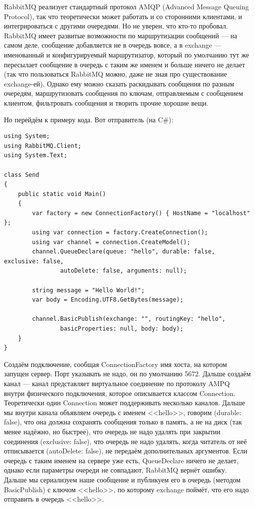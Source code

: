 \documentclass{../../text-style}
\begin{document}
RabbitMQ реализует стандартный протокол AMQP (Advanced Message Queuing Protocol), так что теоретически может работать и со сторонними клиентами, и интегрироваться с другими очередями. Но не уверен, что кто-то пробовал. RabbitMQ имеет развитые возможности по маршрутизации сообщений --- на самом деле, сообщение добавляется не в очередь вовсе, а в exchange --- именованный и конфигурируемый маршрутизатор, который по умолчанию тут же пересылает сообщение в очередь с таким же именем и больше ничего не делает (так что пользоваться RabbitMQ можно, даже не зная про существование exchange-ей). Однако ему можно сказать раскидывать сообщения по разным очередям, маршрутизовать сообщения по ключам, отправляемым с сообщением клиентом, фильтровать сообщения и творить прочие хорошие вещи.

Но перейдём к примеру кода. Вот отправитель (на C\#):

\begin{verbatim}
using System;
using RabbitMQ.Client;
using System.Text;

class Send
{
    public static void Main()
    {
        var factory = new ConnectionFactory() { HostName = "localhost" };
        using var connection = factory.CreateConnection();
        using var channel = connection.CreateModel();
        channel.QueueDeclare(queue: "hello", durable: false, exclusive: false,
                autoDelete: false, arguments: null);

        string message = "Hello World!";
        var body = Encoding.UTF8.GetBytes(message);

        channel.BasicPublish(exchange: "", routingKey: "hello",
                basicProperties: null, body: body);
    }
}
\end{verbatim}

Создаём подключение, сообщая ConnectionFactory имя хоста, на котором запущен сервер. Порт указывать не надо, он по умолчанию 5672. Дальше создаём канал --- канал представляет виртуальное соединение по протоколу AMPQ внутри физического подключения, которое описывается классом Connection. Теоретически один Connection может поддерживать несколько каналов. Дальше мы внутри канала объявляем очередь с именем <<hello>>, говорим (durable: false), что она должна сохранять сообщения только в память, а не на диск (так менее надёжно, но быстрее), что очередь не надо удалять при закрытии соединения (exclusive: false), что очередь не надо удалять, когда читатель от неё отписывается (autoDelete: false), не передаём дополнительных аргументов. Если очередь с таким именем на сервере уже есть, QueueDeclare ничего не делает, однако если параметры очереди не совпадают, RabbitMQ вернёт ошибку. Дальше мы сериализуем наше сообщение и публикуем его в очередь (методом BasicPublish) с ключом <<hello>>, по которому exchange поймёт, что его надо отправить в очередь <<hello>>.
\end{document}
